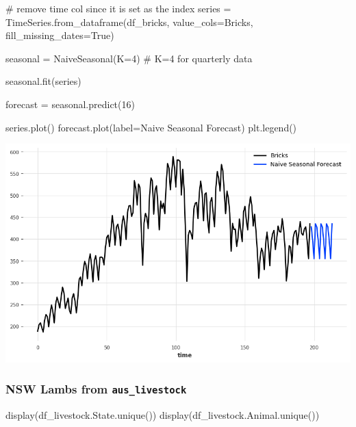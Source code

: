 \documentclass[
  11pt,
]{article}
\newenvironment{Shaded}{\begin{snugshade}}{\end{snugshade}}
\newcommand{\CommentTok}[1]{\textcolor[rgb]{0.37,0.37,0.37}{#1}}
\newcommand{\DecValTok}[1]{\textcolor[rgb]{0.68,0.00,0.00}{#1}}
\newcommand{\NormalTok}[1]{\textcolor[rgb]{0.00,0.23,0.31}{#1}}
\newcommand{\OperatorTok}[1]{\textcolor[rgb]{0.37,0.37,0.37}{#1}}
\newcommand{\StringTok}[1]{\textcolor[rgb]{0.13,0.47,0.30}{#1}}
\newcommand{\VariableTok}[1]{\textcolor[rgb]{0.07,0.07,0.07}{#1}}
\begin{document}
\begin{Shaded}
\begin{Highlighting}[]
\CommentTok{\# remove time col since it is set as the index}
\NormalTok{series }\OperatorTok{=}\NormalTok{ TimeSeries.from\_dataframe(df\_bricks, value\_cols}\OperatorTok{=}\StringTok{\textquotesingle{}Bricks\textquotesingle{}}\NormalTok{, fill\_missing\_dates}\OperatorTok{=}\VariableTok{True}\NormalTok{)}

\NormalTok{seasonal }\OperatorTok{=}\NormalTok{ NaiveSeasonal(K}\OperatorTok{=}\DecValTok{4}\NormalTok{) }\CommentTok{\# K=4 for quarterly data}

\NormalTok{seasonal.fit(series)}

\NormalTok{forecast }\OperatorTok{=}\NormalTok{ seasonal.predict(}\DecValTok{16}\NormalTok{)}

\NormalTok{series.plot()}
\NormalTok{forecast.plot(label}\OperatorTok{=}\StringTok{\textquotesingle{}Naive Seasonal Forecast\textquotesingle{}}\NormalTok{)}
\NormalTok{plt.legend()}
\end{Highlighting}
\end{Shaded}

\includegraphics{hw3_files/figure-pdf/cell-14-output-1.png}

\subsubsection{\texorpdfstring{NSW Lambs from
\texttt{aus\_livestock}}{NSW Lambs from aus\_livestock}}\label{nsw-lambs-from-aus_livestock}

\begin{Shaded}
\begin{Highlighting}[]
\NormalTok{display(df\_livestock.State.unique())}
\NormalTok{display(df\_livestock.Animal.unique())}
\end{Highlighting}
\end{Shaded}
\end{document}

